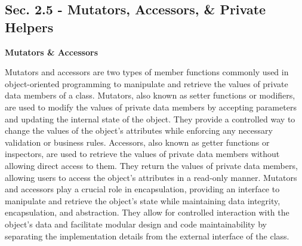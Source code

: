 \subsection{Sec. 2.5 - Mutators, Accessors, \& Private Helpers}
\noindent \textbf{Mutators \& Accessors}

Mutators and accessors are two types of member functions commonly used in object-oriented programming to manipulate and retrieve the values of private data members of a class. Mutators, also known as setter functions or 
modifiers, are used to modify the values of private data members by accepting parameters and updating the internal state of the object. They provide a controlled way to change the values of the object's attributes while 
enforcing any necessary validation or business rules. Accessors, also known as getter functions or inspectors, are used to retrieve the values of private data members without allowing direct access to them. They return 
the values of private data members, allowing users to access the object's attributes in a read-only manner. Mutators and accessors play a crucial role in encapsulation, providing an interface to manipulate and retrieve 
the object's state while maintaining data integrity, encapsulation, and abstraction. They allow for controlled interaction with the object's data and facilitate modular design and code maintainability by separating the 
implementation details from the external interface of the class. \\

